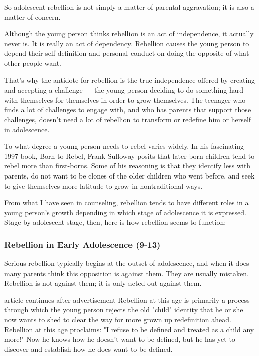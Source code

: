 \documentclass[10pt,a4paper]{article}
\begin{document}
So adolescent rebellion is not simply a matter of parental aggravation; it is also a matter of concern.

Although the young person thinks rebellion is an act of independence, it actually never is. It is really an act of dependency. Rebellion causes the young person to depend their self-definition and personal conduct on doing the opposite of what other people want.

That's why the antidote for rebellion is the true independence offered by creating and accepting a challenge — the young person deciding to do something hard with themselves for themselves in order to grow themselves. The teenager who finds a lot of challenges to engage with, and who has parents that support those challenges, doesn't need a lot of rebellion to transform or redefine him or herself in adolescence.

To what degree a young person needs to rebel varies widely. In his fascinating 1997 book, Born to Rebel, Frank Sulloway posits that later-born children tend to rebel more than first-borns. Some of his reasoning is that they identify less with parents, do not want to be clones of the older children who went before, and seek to give themselves more latitude to grow in nontraditional ways.

From what I have seen in counseling, rebellion tends to have different roles in a young person's growth depending in which stage of adolescence it is expressed. Stage by adolescent stage, then, here is how rebellion seems to function:

\subsubsection{Rebellion in Early Adolescence (9-13)}

Serious rebellion typically begins at the outset of adolescence, and when it does many parents think this opposition is against them. They are usually mistaken. Rebellion is not against them; it is only acted out against them.

article continues after advertisement
Rebellion at this age is primarily a process through which the young person rejects the old "child" identity that he or she now wants to shed to clear the way for more grown up redefinition ahead. Rebellion at this age proclaims: "I refuse to be defined and treated as a child any more!" Now he knows how he doesn't want to be defined, but he has yet to discover and establish how he does want to be defined.
\end{document}
